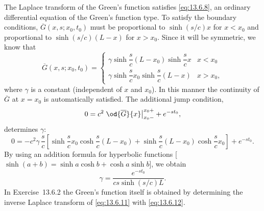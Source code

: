 The Laplace transform of the Green's function satisfies \eqref{eq:13.6.8}, an ordinary differential equation of the Green's function type.  To satisfy the boundary conditions, $\overline{G}(x,s;x_0,t_0)$ must be proportional to $\sinh(s/c)x$ for $x < x_0$ and proportional to $\sinh(s/c)(L-x)$ for $x > x_0$.  Since it will be symmetric, we know that
\begin{equation}
\overline{G}(x,s;x_0,t_0) = \begin{cases}
\gamma\sinh\dfrac{s}{c}(L-x_0)\sinh\dfrac{s}{c}x & x < x_0 \\[8pt]
\gamma\sinh\dfrac{s}{c}x_0\sinh\dfrac{s}{c}(L-x) & x > x_0,
\end{cases}
\label{eq:13.6.11}
\end{equation}
where $\gamma$ is a constant (independent of $x$ and $x_0$).  In this manner the continuity of $\overline{G}$ at $x = x_0$ is automatically satisfied.  The additional jump condition,
\[
0 = c^2\left.\od{\overline{G}}{x}\right|_{x_0-}^{x_0+} + e^{-st_0},
\]
determines $\gamma$:
\[
0 = -c^2\gamma\,\frac{s}{c}\left[\sinh\frac{s}{c}x_0\cosh\frac{s}{c}(L-x_0)
+ \sinh\frac{s}{c}(L-x_0)\cosh\frac{s}{c}x_0\right] + e^{-st_0}.
\]
By using an addition formula for hyperbolic functions [$\sinh(a+b) = \sinh a\cosh b + \cosh a\sinh b$], we obtain
\begin{equation}
\gamma = \frac{e^{-st_0}}{cs\sinh(s/c)L}.
\label{eq:13.6.12}
\end{equation}
In Exercise~13.6.2 the Green's function itself is obtained by determining the inverse Laplace transform of \eqref{eq:13.6.11} with \eqref{eq:13.6.12}.

